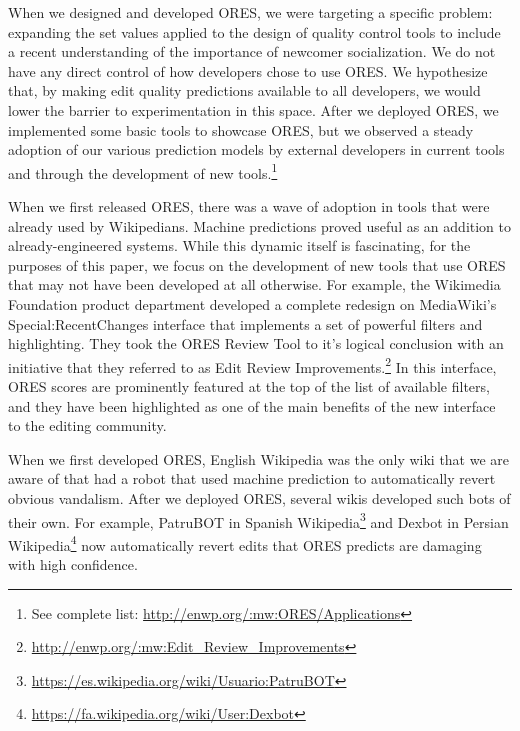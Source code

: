 When we designed and developed ORES, we were targeting a specific problem: expanding the set values applied to the design of quality control tools to include a recent understanding of the importance of newcomer socialization.  We do not have any direct control of how developers chose to use ORES.  We hypothesize that, by making edit quality predictions available to all developers, we would lower the barrier to experimentation in this space.   After we deployed ORES, we implemented some basic tools to showcase ORES, but we observed a steady adoption of our various prediction models by external developers in current tools and through the development of new tools.\footnote{See complete list: \url{http://enwp.org/:mw:ORES/Applications}}

When we first released ORES, there was a wave of adoption in tools that were already used by Wikipedians.  Machine predictions proved useful as an addition to already-engineered systems.  While this dynamic itself is fascinating, for the purposes of this paper, we focus on the development of new tools that use ORES that may not have been developed at all otherwise.  For example, the Wikimedia Foundation product department developed a complete redesign on MediaWiki's Special:RecentChanges interface that implements a set of powerful filters and highlighting.  They took the ORES Review Tool to it's logical conclusion with an initiative that they referred to as Edit Review Improvements.\footnote{\url{http://enwp.org/:mw:Edit_Review_Improvements}}  In this interface, ORES scores are prominently featured at the top of the list of available filters, and they have been highlighted as one of the main benefits of the new interface to the editing community.

When we first developed ORES, English Wikipedia was the only wiki that we are aware of that had a robot that used machine prediction to automatically revert obvious vandalism\cite{carter2008cluebot}.  After we deployed ORES, several wikis developed such bots of their own.  For example, PatruBOT in Spanish Wikipedia\footnote{\url{https://es.wikipedia.org/wiki/Usuario:PatruBOT}} and Dexbot in Persian Wikipedia\footnote{\url{https://fa.wikipedia.org/wiki/User:Dexbot}} now automatically revert edits that ORES predicts are damaging with high confidence.

